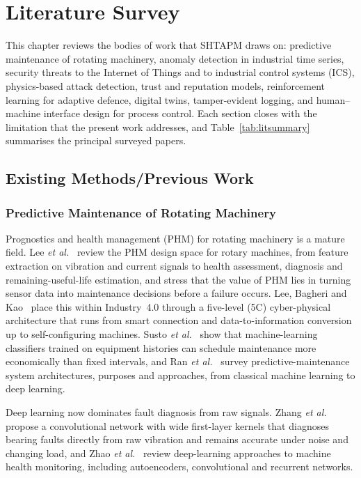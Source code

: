 \chapter{Literature Survey}
\label{ch:literature}

This chapter reviews the bodies of work that SHTAPM draws on: predictive maintenance of rotating machinery, anomaly detection in industrial time series, security threats to the Internet of Things and to industrial control systems (ICS), physics-based attack detection, trust and reputation models, reinforcement learning for adaptive defence, digital twins, tamper-evident logging, and human--machine interface design for process control. Each section closes with the limitation that the present work addresses, and Table~\ref{tab:litsummary} summarises the principal surveyed papers.

\section{Existing Methods/Previous Work}

\subsection{Predictive Maintenance of Rotating Machinery}

Prognostics and health management (PHM) for rotating machinery is a mature field. Lee \emph{et al.}~\cite{lee2014phm} review the PHM design space for rotary machines, from feature extraction on vibration and current signals to health assessment, diagnosis and remaining-useful-life estimation, and stress that the value of PHM lies in turning sensor data into maintenance decisions before a failure occurs. Lee, Bagheri and Kao~\cite{lee2015cps} place this within Industry~4.0 through a five-level (5C) cyber-physical architecture that runs from smart connection and data-to-information conversion up to self-configuring machines. Susto \emph{et al.}~\cite{susto2015pdm} show that machine-learning classifiers trained on equipment histories can schedule maintenance more economically than fixed intervals, and Ran \emph{et al.}~\cite{ran2019pdmsurvey} survey predictive-maintenance system architectures, purposes and approaches, from classical machine learning to deep learning.

Deep learning now dominates fault diagnosis from raw signals. Zhang \emph{et al.}~\cite{zhang2017wdcnn} propose a convolutional network with wide first-layer kernels that diagnoses bearing faults directly from raw vibration and remains accurate under noise and changing load, and Zhao \emph{et al.}~\cite{zhao2019dlhealth} review deep-learning approaches to machine health monitoring, including autoencoders, convolutional and recurrent networks.

